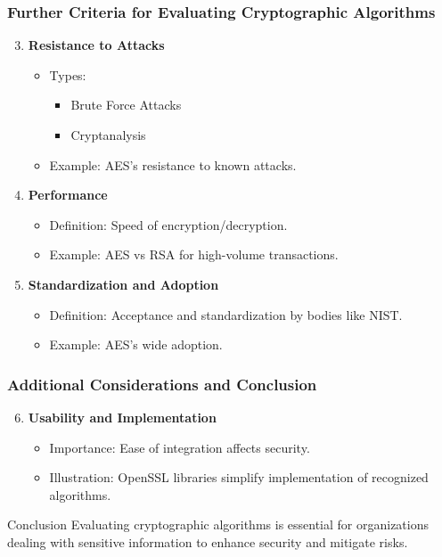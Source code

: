 \documentclass{beamer}
\begin{document}
\begin{frame}[fragile]
    \frametitle{Further Criteria for Evaluating Cryptographic Algorithms}
    
    \begin{enumerate}
        \setcounter{enumi}{2}
        \item \textbf{Resistance to Attacks}
            \begin{itemize}
                \item Types: 
                    \begin{itemize}
                        \item Brute Force Attacks
                        \item Cryptanalysis
                    \end{itemize}
                \item Example: AES’s resistance to known attacks.
            \end{itemize}
        
        \item \textbf{Performance}
            \begin{itemize}
                \item Definition: Speed of encryption/decryption.
                \item Example: AES vs RSA for high-volume transactions.
            \end{itemize}

        \item \textbf{Standardization and Adoption}
            \begin{itemize}
                \item Definition: Acceptance and standardization by bodies like NIST.
                \item Example: AES’s wide adoption.
            \end{itemize}
    \end{enumerate}
\end{frame}

\begin{frame}[fragile]
    \frametitle{Additional Considerations and Conclusion}
    
    \begin{enumerate}
        \setcounter{enumi}{5}
        \item \textbf{Usability and Implementation}
            \begin{itemize}
                \item Importance: Ease of integration affects security.
                \item Illustration: OpenSSL libraries simplify implementation of recognized algorithms.
            \end{itemize}
    \end{enumerate}

    \begin{block}{Conclusion}
        Evaluating cryptographic algorithms is essential for organizations dealing with sensitive information to enhance security and mitigate risks.
    \end{block}

\end{frame}
\end{document}
